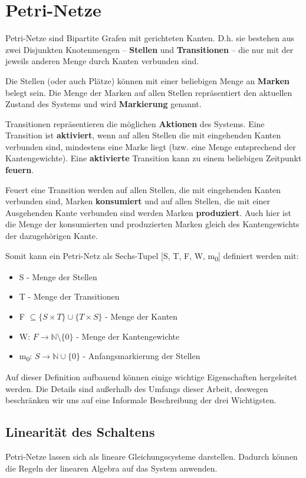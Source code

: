 

\chapter{Petri-Netze}
Petri-Netze sind Bipartite Grafen mit gerichteten Kanten.
D.h. sie bestehen aus zwei Disjunkten Knotenmengen -- \textbf{Stellen} und \textbf{Transitionen} -- die nur mit der jeweils anderen Menge durch Kanten verbunden sind.

Die Stellen (oder auch Plätze) können mit einer beliebigen Menge an \textbf{Marken} belegt sein.
Die Menge der Marken auf allen Stellen repräsentiert den aktuellen Zustand des Systems und wird \textbf{Markierung} genannt.

Transitionen repräsentieren die möglichen \textbf{Aktionen} des Systems. 
Eine Transition ist \textbf{aktiviert}, wenn auf allen Stellen die mit eingehenden Kanten verbunden sind, mindestens eine Marke liegt (bzw. eine Menge entsprechend der Kantengewichte).
Eine \textbf{aktivierte} Transition kann zu einem beliebigen Zeitpunkt \textbf{feuern}.

Feuert eine Transition werden auf allen Stellen, die mit eingehenden Kanten verbunden sind, Marken \textbf{konsumiert} und auf allen Stellen, die mit einer Ausgehenden Kante verbunden sind werden Marken \textbf{produziert}.
Auch hier ist die Menge der konsumierten und produzierten Marken gleich des Kantengewichts der dazugehörigen Kante.

Somit kann ein Petri-Netz als Sechs-Tupel [S, T, F, W, m\textsubscript{0}] definiert werden mit:
\begin{itemize}
    \item S - Menge der Stellen
    \item T - Menge der Transitionen
    \item F $\subseteq \{ S \times T \} \cup \{ T \times S \}$ - Menge der Kanten
    \item W: $ F \to \mathbb{N} \setminus \{0\}$ - Menge der Kantengewichte
    \item m\textsubscript{0}: $S \to \mathbb{N} \cup \{0\}$ - Anfangsmarkierung der Stellen
\end{itemize}
Auf dieser Definition aufbauend können einige wichtige Eigenschaften hergeleitet werden.
Die Details sind außerhalb des Umfangs dieser Arbeit, deswegen beschränken wir uns auf eine Informale Beschreibung der drei Wichtigsten.

\section{Linearität des Schaltens}
\label{linear}
Petri-Netze lassen sich als lineare Gleichungssysteme darstellen. 
Dadurch können die Regeln der linearen Algebra auf das System anwenden. 

